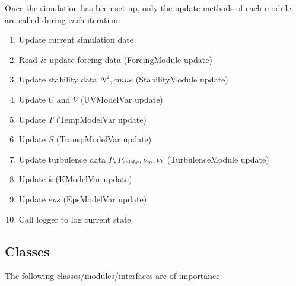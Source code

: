 \documentclass[paper=a4, fontsize=12pt]{article}
\begin{document}
Once the simulation has been set up, only the update methods of each module are called during each iteration:
\begin{enumerate}
	\item Update current simulation date
	\item Read \& update forcing data (ForcingModule update)
	\item Update stability data $N^{2},cmue$ (StabilityModule update)
	\item Update $U$ and $V$ (UVModelVar update)
	\item Update $T$ (TempModelVar update)
	\item Update $S$ (TranspModelVar update)
	\item Update turbulence data $P,P_{seiche},\nu_{m},\nu_{h}$ (TurbulenceModule update)
	\item Update $k$ (KModelVar update)
	\item Update $eps$ (EpsModelVar update)
	\item Call logger to log current state
\end{enumerate}

\newpage
\subsection{Classes}

The following classes/modules/interfaces are of importance:
\end{document}
